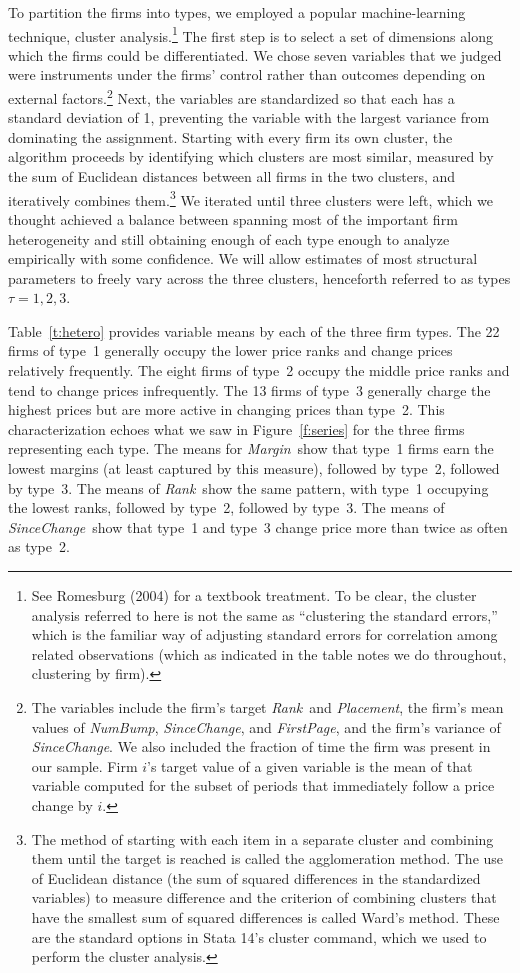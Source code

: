 \documentclass[11pt]{article}
\newcommand{\Margin}{\mbox{\it Margin}}
\newcommand{\SinceChange}{\mbox{\it SinceChange}}
\newcommand{\Rank}{\mbox{\it Rank}}
\newcommand{\NumBump}{\mbox{\it NumBump}}
\newcommand{\Placement}{\mbox{\it Placement}}
\newcommand{\FirstPage}{\mbox{\it FirstPage}}
\begin{document}
\begin{spacing}{1.3}
To partition the firms into types, we employed a popular
machine-learning technique, cluster analysis.\footnote{See Romesburg
  (2004) for a textbook treatment. To be clear, the cluster analysis
  referred to here is not the same as ``clustering the standard
  errors,'' which is the familiar way of adjusting standard errors for
  correlation among related observations (which as indicated in the
  table notes we do throughout, clustering by firm).}  The first step
is to select a set of dimensions along which the firms could be
differentiated. We chose seven variables that we judged were
instruments under the firms' control rather than outcomes depending on
external factors.\footnote{The variables include the firm's target
  \Rank\ and \Placement, the firm's mean values of \NumBump,
  \SinceChange, and \FirstPage, and the firm's variance of
  \SinceChange. We also included the fraction of time the firm was
  present in our sample. Firm $i$'s target value of a given variable
  is the mean of that variable computed for the subset of periods that
  immediately follow a price change by $i$.} Next, the variables are
standardized so that each has a standard deviation of 1, preventing
the variable with the largest variance from dominating the
assignment. Starting with every firm its own cluster, the algorithm
proceeds by identifying which clusters are most similar, measured by
the sum of Euclidean distances between all firms in the two clusters,
and iteratively combines them.\footnote{The method of starting with
  each item in a separate cluster and combining them until the target
  is reached is called the agglomeration method. The use of Euclidean
  distance (the sum of squared differences in the standardized
  variables) to measure difference and the criterion of combining
  clusters that have the smallest sum of squared differences is called
  Ward's method. These are the standard options in Stata 14's cluster
  command, which we used to perform the cluster analysis.}  We
iterated until three clusters were left, which we thought achieved a
balance between spanning most of the important firm heterogeneity and
still obtaining enough of each type enough to analyze empirically with
some confidence. We will allow estimates of most structural parameters
to freely vary across the three clusters, henceforth referred to as
types $\tau = 1,2,3$.

Table~\ref{t:hetero} provides variable means by each of the three firm
types.  The 22 firms of type~1 generally occupy the lower price ranks
and change prices relatively frequently.  The eight firms of type~2
occupy the middle price ranks and tend to change prices infrequently.
The 13 firms of type~3 generally charge the highest prices but are
more active in changing prices than type~2. This characterization
echoes what we saw in Figure~\ref{f:series} for the three firms
representing each type.  The means for \Margin\ show that type~1 firms
earn the lowest margins (at least captured by this measure), followed
by type~2, followed by type~3. The means of \Rank\ show the same
pattern, with type~1 occupying the lowest ranks, followed by type~2,
followed by type~3. The means of \SinceChange\ show that type~1 and
type~3 change price more than twice as often as type~2.


\end{spacing}
\end{document}
